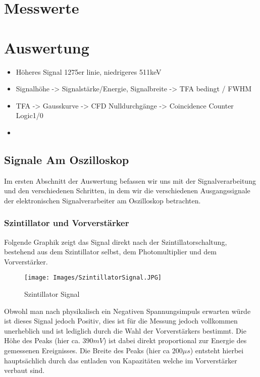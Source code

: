 \documentclass{article}
\begin{document}
    \section{Messwerte}

    \section{Auswertung}
        \begin{itemize}
            \item Höheres Signal 1275er linie, niedrigeres 511keV
            \item Signalhöhe -> Signalstärke/Energie, Signalbreite -> TFA bedingt / FWHM
            \item TFA -> Gausskurve -> CFD Nulldurchgänge -> Coincidence Counter Logic1/0
            \item
        \end{itemize}

        \subsection{Signale Am Oszilloskop}
            Im ersten Abschnitt der Auswertung befassen wir uns mit der Signalverarbeitung und den verschiedenen
            Schritten, in dem wir die verschiedenen Ausgangssignale der elektronischen Signalverarbeiter am Oszilloskop betrachten.


            \subsubsection{Szintillator und Vorverstärker}
                Folgende Graphik zeigt das Signal direkt nach der Szintillatorschaltung, bestehend aus
                dem Szintillator selbst, dem Photomultiplier und dem Vorverstärker.
                \begin{figure}[H]
                    \centering
                    \texttt{[image: Images/SzintillatorSignal.JPG]}
                    \caption{Szintillator Signal}
                \end{figure}
                Obwohl man nach physikalisch ein Negativen Spannungsimpuls erwarten würde ist dieses Signal jedoch Positiv, dies ist für die
                Messung jedoch vollkommen unerheblich und ist lediglich durch die Wahl der Vorverstärkers bestimmt.
                Die Höhe des Peaks (hier ca. $390mV$) ist dabei direkt proportional zur Energie des gemessenen
                Ereignisses. Die Breite des Peaks (hier ca $200\mu s$) entsteht hierbei hauptsächlich durch das entladen von Kapazitäten
                welche im Vorverstärker verbaut sind.
\end{document}

